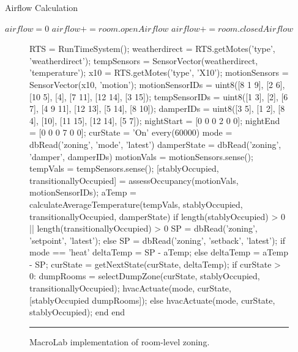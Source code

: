 \begin{algorithm}                      %
\caption{Airflow Calculation}          %
\label{alg:calculateAirflow}%
\begin{algorithmic}                    %
\STATE $airflow = 0$
\STATE $airflow += room.openAirflow$
\ELSE
\STATE $airflow += room.closedAirflow$
\ENDIF
\ENDFOR
\end{algorithmic}
\end{algorithm}

\begin{figure}
  \begin{macrolab}
RTS = RunTimeSystem();
weatherdirect = RTS.getMotes('type', 'weatherdirect');
tempSensors = SensorVector(weatherdirect, 'temperature');
x10 = RTS.getMotes('type', 'X10');
motionSensors = SensorVector(x10, 'motion');
motionSensorIDs = uint8({[8 1 9], [2 6], [10 5], [4], [7 11], [12 14], [3 15]});
tempSensorIDs = uint8({[1 3], [2], [6 7], [4 9 11], [12 13], [5 14], [8 10]}); 
damperIDs = uint8({[3 5], [1 2], [8 4], [10], [11 15], [12 14], [5 7]});
nightStart = [0 0 0 2 0 0];
nightEnd = [0 0 0 7 0 0];
curState = 'On'
every(60000)
  mode = dbRead('zoning', 'mode', 'latest')
  damperState = dbRead('zoning', 'damper', damperIDs) 
  motionVals = motionSensors.sense();
  tempVals =  tempSensors.sense();
  [stablyOccupied, transitionallyOccupied] = assessOccupancy(motionVals, motionSensorIDs);
  aTemp = calculateAverageTemperature(tempVals, stablyOccupied, transitionallyOccupied, damperState)
  if length(stablyOccupied) > 0 || length(transitionallyOccupied) > 0
    SP = dbRead('zoning', 'setpoint', 'latest');
  else
    SP = dbRead('zoning', 'setback', 'latest');
  if mode == 'heat'
    deltaTemp = SP - aTemp;
  else
    deltaTemp = aTemp - SP;
  curState = getNextState(curState, deltaTemp);
  if curState > 0:
    dumpRooms = selectDumpZone(curState, stablyOccupied, transitionallyOccupied);
    hvacActuate(mode, curState, [stablyOccupied dumpRooms]);
  else
    hvacActuate(mode, curState, stablyOccupied);
  end
end
  \end{macrolab}
  \smallskip
  \hrule width 1\columnwidth
  \caption{MacroLab implementation of room-level zoning.}
  \label{code:cs2}
\end{figure}
